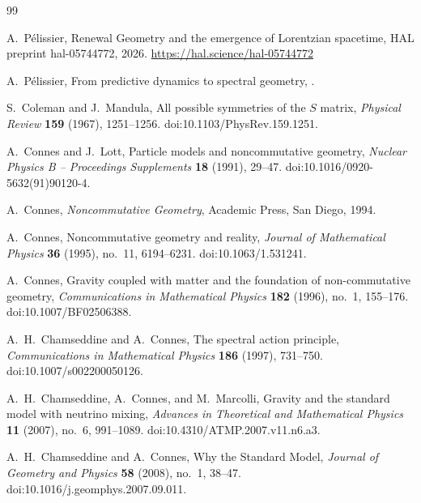 \documentclass[11pt]{article}
\theoremstyle{definition}
\theoremstyle{remark}
\begin{document}
\begin{thebibliography}{99}

A.~P\'elissier,
\newblock Renewal Geometry and the emergence of Lorentzian spacetime,
\newblock HAL preprint hal-05744772, 2026.
\newblock \url{https://hal.science/hal-05744772}

A.~P\'elissier,
\newblock From predictive dynamics to spectral geometry,
.
\newblock %

S.~Coleman and J.~Mandula,
\newblock All possible symmetries of the $S$ matrix,
\newblock \emph{Physical Review} \textbf{159} (1967), 1251--1256.
\newblock doi:10.1103/PhysRev.159.1251.

A.~Connes and J.~Lott,
\newblock Particle models and noncommutative geometry,
\newblock \emph{Nuclear Physics B -- Proceedings Supplements} \textbf{18} (1991),
29--47.
\newblock doi:10.1016/0920-5632(91)90120-4.

A.~Connes,
\newblock \emph{Noncommutative Geometry},
\newblock Academic Press, San Diego, 1994.

A.~Connes,
\newblock Noncommutative geometry and reality,
\newblock \emph{Journal of Mathematical Physics} \textbf{36} (1995), no.~11,
6194--6231.
\newblock doi:10.1063/1.531241.

A.~Connes,
\newblock Gravity coupled with matter and the foundation of non-commutative
geometry,
\newblock \emph{Communications in Mathematical Physics} \textbf{182} (1996),
no.~1, 155--176.
\newblock doi:10.1007/BF02506388.

A.~H.~Chamseddine and A.~Connes,
\newblock The spectral action principle,
\newblock \emph{Communications in Mathematical Physics} \textbf{186} (1997),
731--750.
\newblock doi:10.1007/s002200050126.

A.~H.~Chamseddine, A.~Connes, and M.~Marcolli,
\newblock Gravity and the standard model with neutrino mixing,
\newblock \emph{Advances in Theoretical and Mathematical Physics}
\textbf{11} (2007), no.~6, 991--1089.
\newblock doi:10.4310/ATMP.2007.v11.n6.a3.

A.~H.~Chamseddine and A.~Connes,
\newblock Why the Standard Model,
\newblock \emph{Journal of Geometry and Physics} \textbf{58} (2008), no.~1,
38--47.
\newblock doi:10.1016/j.geomphys.2007.09.011.


\end{thebibliography}
\end{document}
